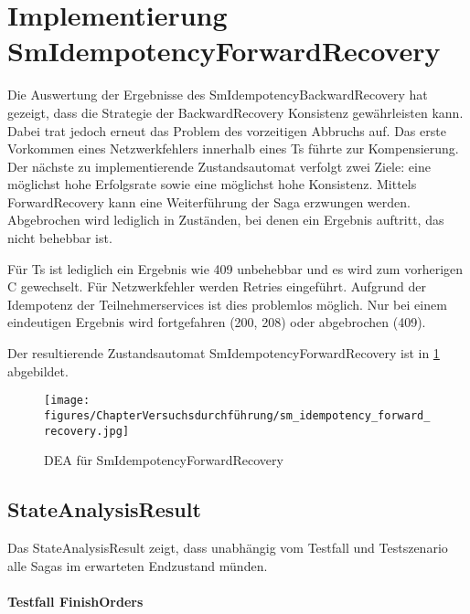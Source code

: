\section{Implementierung SmIdempotencyForwardRecovery}
Die Auswertung der Ergebnisse des SmIdempotencyBackwardRecovery hat gezeigt, dass die Strategie der BackwardRecovery Konsistenz gewährleisten kann. Dabei trat jedoch erneut das Problem des vorzeitigen Abbruchs auf. Das erste Vorkommen eines Netzwerkfehlers innerhalb eines Ts führte zur Kompensierung. Der nächste zu implementierende Zustandsautomat verfolgt zwei Ziele: eine möglichst hohe Erfolgsrate sowie eine möglichst hohe Konsistenz. Mittels ForwardRecovery kann eine Weiterführung der Saga erzwungen werden. Abgebrochen wird lediglich in Zuständen, bei denen ein Ergebnis auftritt, das nicht behebbar ist. 

Für Ts ist lediglich ein Ergebnis wie 409 unbehebbar und es wird zum vorherigen C gewechselt. Für Netzwerkfehler werden Retries eingeführt. Aufgrund der Idempotenz der Teilnehmerservices ist dies problemlos möglich. Nur bei einem eindeutigen Ergebnis wird fortgefahren (200, 208) oder abgebrochen (409). 

Der resultierende Zustandsautomat SmIdempotencyForwardRecovery ist in \cref{fig:SmIdempotencyForwardRecovery} abgebildet.


\begin{figure}[h!]
	\centering
	\texttt{[image: figures/ChapterVersuchsdurchführung/sm\_idempotency\_forward\_recovery.jpg]}
	\caption{DEA für SmIdempotencyForwardRecovery}
	\label{fig:SmIdempotencyForwardRecovery}
\end{figure}
\FloatBarrier

\subsection{StateAnalysisResult}

Das StateAnalysisResult zeigt, dass unabhängig vom Testfall und Testszenario alle Sagas im erwarteten Endzustand münden. 

\paragraph*{Testfall FinishOrders} \mbox{}\\

